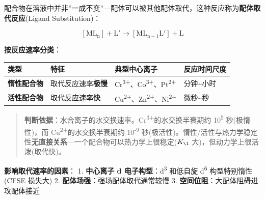 \documentclass[a4paper,11pt]{ctexart}
\newcounter{none}
\newcommand{\箭}{\ensuremath{\rightarrow}}
\newcommand{\左箭}{\ensuremath{\leftarrow}}
\newcommand{\上箭}{\ensuremath{\uparrow}}
\newcommand{\下箭}{\ensuremath{\downarrow}}
\newcommand{\衡}{\ensuremath{\rightleftharpoons}}
\newcommand{\双箭}{\ensuremath{\leftrightarrow}}
\newcommand{\约等于}{\ensuremath{\approx}}
\newcommand{\小于等于}{\ensuremath{\leq}}
\newcommand{\大于等于}{\ensuremath{\geq}}
\newcommand{\不等于}{\ensuremath{\neq}}
\newcommand{\西格马}{\ensuremath{\sigma}}
\newcommand{\派}{\ensuremath{\pi}}
\begin{document}
配合物在溶液中并非''一成不变''---配体可以被其他配体取代，这种反应称为\textbf{配体取代反应}(Ligand Substitution)：

\[[\mathrm{ML_n}] + \mathrm{L'} \rightarrow [\mathrm{ML_{n-1}L'}] + \mathrm{L}\]

\textbf{按反应速率分类}：

{\def\LTcaptype{none} %
\begin{longtable}[]{@{}
  >{\raggedright\arraybackslash}p{}
  >{\raggedright\arraybackslash}p{}
  >{\raggedright\arraybackslash}p{}
  >{\raggedright\arraybackslash}p{}@{}}
\toprule\noalign{}
\begin{minipage}[b]{\linewidth}\raggedright
类型
\end{minipage} & \begin{minipage}[b]{\linewidth}\raggedright
特征
\end{minipage} & \begin{minipage}[b]{\linewidth}\raggedright
典型中心离子
\end{minipage} & \begin{minipage}[b]{\linewidth}\raggedright
反应时间尺度
\end{minipage} \\
\midrule\noalign{}
\endhead
\bottomrule\noalign{}
\endlastfoot
\textbf{惰性配合物} & 取代反应速率\textbf{极慢} & Cr\textsuperscript{3+}、Co\textsuperscript{3+}、Pt\textsuperscript{2+} & 分钟\textasciitilde 小时 \\
\textbf{活性配合物} & 取代反应速率\textbf{快} & Cu\textsuperscript{2+}、Zn\textsuperscript{2+}、Ni\textsuperscript{2+} & 微秒\textasciitilde 秒 \\
\end{longtable}
}

\begin{quote}
\textbf{判断依据}：水合离子的水交换速率。Cr\textsuperscript{3+}的水交换半衰期约 10\textsuperscript{5} 秒(极惰性)，而 Cu\textsuperscript{2+}的水交换半衰期约 10\textsuperscript{-9} 秒(极活性)。惰性/活性与热力学稳定性\textbf{无直接关系}---一个配合物可以热力学上很稳定(\(K_{\1}\) 大)，但动力学上很活泼(取代快)。
\end{quote}

\textbf{影响取代速率的因素}：
1. \textbf{中心离子 d 电子构型}：d\textsuperscript{3} 和低自旋 d\textsuperscript{6} 构型特别惰性(CFSE 损失大)
2. \textbf{配体场强}：强场配体取代通常较慢
3. \textbf{空间位阻}：大配体阻碍进攻配体接近
\end{document}
